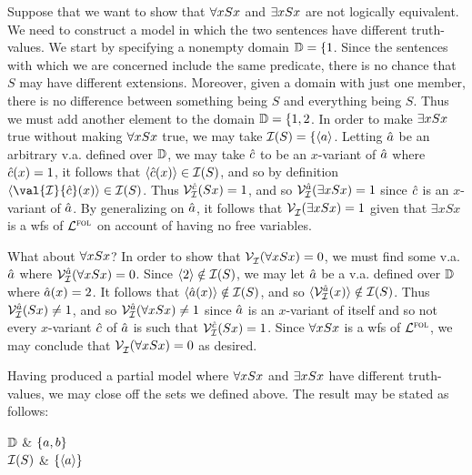 Suppose that we want to show that $\forall x Sx$ and $\exists x Sx$ are not logically equivalent.
We need to construct a model in which the two sentences have different truth-values.
We start by specifying a nonempty domain $\mathbb{D}=\{1$.
Since the sentences with which we are concerned include the same predicate, there is no chance that $S$ may have different extensions. 
Moreover, given a domain with just one member, there is no difference between something being $S$ and everything being $S$.
Thus we must add another element to the domain $\mathbb{D}=\{1,2$.
In order to make $\exists x Sx$ true without making $\forall x Sx$ true, we may take $\mathcal{I}(S)=\{\langle a\rangle$.
Letting $\hat{a}$ be an arbitrary v.a. defined over $\mathbb{D}$, we may take $\hat{c}$ to be an $x$-variant of $\hat{a}$ where $\hat{c}(x)=1$, it follows that $\langle\hat{c}(x)\rangle\in\mathcal{I}(S)$, and so by definition $\tuple{\val{\I}{\va{c}}(x)}\in\I(S)$.
Thus $\mathcal{V}_{\mathcal{I}}^{\hat{c}}(Sx)=1$, and so $\mathcal{V}_{\mathcal{I}}^{\hat{a}}(\exists xSx)=1$ since $\hat{c}$ is an $x$-variant of $\hat{a}$.
By generalizing on $\hat{a}$, it follows that $\mathcal{V}_{\mathcal{I}}^{}(\exists xSx)=1$ given that $\exists xSx$ is a wfs of $\mathcal{L}^{\textsc{fol}}$ on account of having no free variables. 

What about $\forall x Sx$?
In order to show that $\mathcal{V}_{\mathcal{I}}^{}(\forall xSx) = 0$, we must find some v.a. $\hat{a}$ where $\mathcal{V}_{\mathcal{I}}^{\hat{a}}(\forall xSx) = 0$.
Since $\langle2\rangle\notin\mathcal{I}(S)$, we may let $\hat{a}$ be a v.a. defined over $\mathbb{D}$ where $\hat{a}(x) = 2$.
It follows that $\langle\hat{a}(x)\rangle\notin\mathcal{I}(S)$, and so $\langle\mathcal{V}_{\mathcal{I}}^{\hat{a}}(x)\rangle\notin\mathcal{I}(S)$.
Thus $\mathcal{V}_{\mathcal{I}}^{\hat{a}}(Sx)\neq 1$, and so $\mathcal{V}_{\mathcal{I}}^{\hat{a}}(\forall xSx)\neq 1$ since $\hat{a}$ is an $x$-variant of itself and so not every $x$-variant $\hat{c}$ of $\hat{a}$ is such that $\mathcal{V}_{\mathcal{I}}^{\hat{c}}(Sx) = 1$. 
Since $\forall xSx$ is a wfs of $\mathcal{L}^{\textsc{fol}}$, we may conclude that $\mathcal{V}_{\mathcal{I}}^{}(\forall xSx) = 0$ as desired. 

Having produced a partial model where $\forall x Sx$ and $\exists x Sx$ have different truth-values, we may close off the sets we defined above. 
The result may be stated as follows:

\begin{partialmodel}
  $\mathbb{D}$			& $\lbrace a,b\rbrace$\\
	$\mathcal{I}(S)$ 	& $\lbrace\langle a\rangle\rbrace$\\
\end{partialmodel}

